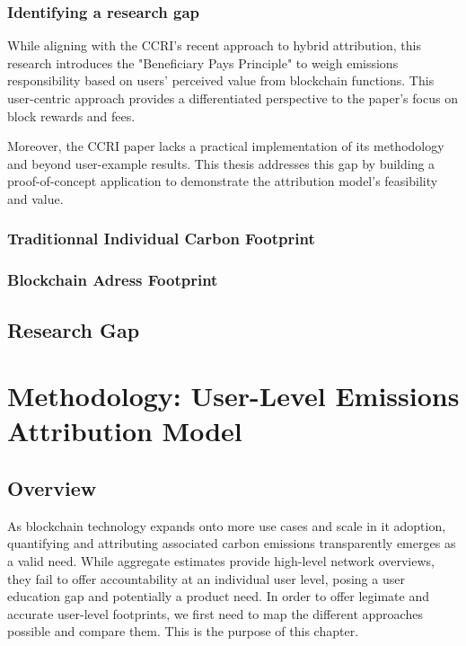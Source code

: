 \documentclass[11pt]{report}
\begin{document}
\subsection{Identifying a research gap}

While aligning with the CCRI's recent approach to hybrid attribution, this research introduces the "Beneficiary Pays Principle" to weigh emissions responsibility based on users' perceived value from blockchain functions. This user-centric approach provides a differentiated perspective to the paper's focus on block rewards and fees.

Moreover, the CCRI paper lacks a practical implementation of its methodology and beyond user-example results. This thesis addresses this gap by building a proof-of-concept application to demonstrate the attribution model's feasibility and value.

\subsection{Traditionnal Individual Carbon Footprint}
\subsection{Blockchain Adress Footprint}
\section{Research Gap}


\chapter{Methodology: User-Level Emissions Attribution Model}
\section{Overview}


As blockchain technology expands onto more use cases and scale in it adoption, quantifying and attributing associated carbon emissions transparently emerges as a valid need. While aggregate estimates provide high-level network overviews, they fail to offer accountability at an individual user level, posing a user education gap and potentially a product need. In order to offer legimate and accurate user-level footprints, we first need to map the different approaches possible and compare them. This is the purpose of this chapter.
\end{document}
